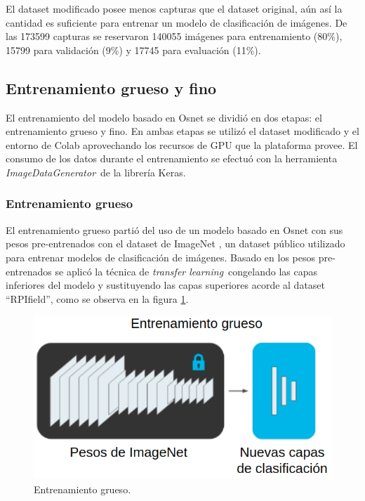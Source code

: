 El dataset modificado posee menos capturas que el dataset original, aún así la cantidad es suficiente para entrenar un modelo de clasificación de imágenes. De las 173599 capturas se reservaron 140055 imágenes para entrenamiento (80\%), 15799 para validación (9\%) y 17745 para evaluación (11\%).

\newpage

\subsection{Entrenamiento grueso y fino}

El entrenamiento del modelo basado en Osnet se dividió en dos etapas: el entrenamiento grueso y fino. En ambas etapas se utilizó el dataset modificado y el entorno de Colab aprovechando los recursos de GPU que la plataforma provee. El consumo de los datos durante el entrenamiento se efectuó con la herramienta \textit{ImageDataGenerator}\ de la librería Keras.

\subsubsection{Entrenamiento grueso}

El entrenamiento grueso partió del uso de un modelo basado en Osnet con sus pesos pre-entrenados con el dataset de ImageNet \citep{IMAGENET}, un dataset público utilizado para entrenar modelos de clasificación de imágenes. Basado en los pesos pre-entrenados se aplicó la técnica de \textit{transfer learning}\ congelando las capas inferiores del modelo y sustituyendo las capas superiores acorde al dataset ``RPIfield'', como se observa en la figura \ref{fig:entrenamientoGrueso}.

\begin{figure}[ht]
	\centering
	\includegraphics[scale=.60]{./Figures/entrenamientoGrueso.png}
	\caption{Entrenamiento grueso.}
	\label{fig:entrenamientoGrueso}
\end{figure}

